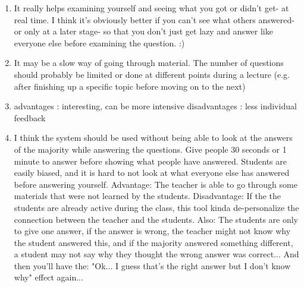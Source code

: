 \begin{enumerate}

    \item It really helps examining yourself and seeing what you got or didn't get- at real time. I think it's obviously better if you can't see what others answered- or only at a later stage- so that you don't just get lazy and answer like everyone else before examining the question. :)
    
    \item It may be a slow way of going through material. The number of questions should probably be limited or done at different points during a lecture (e.g. after finishing up a specific topic before moving on to the next)
    
    \item advantages : interesting, can be more intensive disadvantages : less individual feedback
    
    \item  I think the system should be used without being able to look at the answers of the majority while answering the questions. Give people 30 seconds or 1 minute to answer before showing what people have answered.
    Students are easily biased, and it is hard to not look at what everyone else has answered before answering yourself.
    Advantage: The teacher is able to go through some materials that were not learned by the students.
    Disadvantage: If the the students are already active during the class, this tool kinda de-personalize the connection between the teacher and the students.
    Also: The students are only to give one answer, if the answer is wrong, the teacher might not know why the student answered this, and if the majority answered something different, a student may not say why they thought the wrong answer was correct... And then you'll have the: "Ok... I guess that's the right answer but I don't know why" effect again...

\end{enumerate}